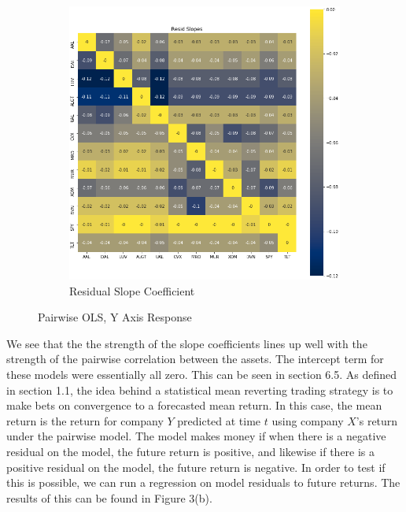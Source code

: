 \documentclass{article}
\begin{document}
\begin{figure}[h!]
\begin{subfigure}{.5\textwidth}
    \includegraphics[width=.95\linewidth]{../Figures/pair_resid_reg_slope.png}
    \caption{Residual Slope Coefficient}
  \end{subfigure}
  \caption{Pairwise OLS, Y Axis Response}
\end{figure}
We see that the the strength of the slope coefficients lines up well with the strength of the
pairwise correlation between the assets. The intercept term for these models were essentially
all zero. This can be seen in section 6.5. As defined in section 1.1, the idea behind
a statistical mean reverting trading strategy is to make bets on convergence to a forecasted
mean return. In this case, the mean return is the return for company $Y$ predicted 
at time $t$ using company $X$'s return under the pairwise model. The model makes money 
if when there is a negative residual on the model, the future return is positive, and
likewise if there is a positive residual on the model, the future return is negative.
In order to test if this is possible, we can run a regression on model residuals to 
future returns. The results of this can be found in Figure 3(b).
\end{document}
